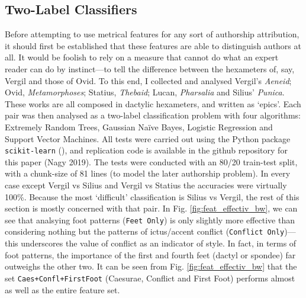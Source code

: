 \documentclass[11pt,a4paper]{scrartcl} %
\begin{document}
{\subsection{Two-Label Classifiers}

Before attempting to use metrical features for any sort of authorship attribution, it should first be established that these features are able to distinguish authors at all. It would be foolish to rely on a measure that cannot do what an expert reader can do by instinct---to tell the difference between the hexameters of, say, Vergil and those of Ovid. To this end, I collected and analysed Vergil's \textit{Aeneid}; Ovid, \textit{Metamorphoses}; Statius, \textit{Thebaid}; Lucan, \textit{Pharsalia} and Silius' \textit{Punica}. These works are all composed in dactylic hexameters, and written as `epics'. Each pair was then analysed as a two-label classification problem with four algorithms: Extremely Random Trees, Gaussian Naïve Bayes, Logistic Regression and Support Vector Machines. All tests were carried out using the Python package \texttt{scikit-learn} (\cite{scikit-learn}), and replication code is available in the github repository for this paper (Nagy 2019). The tests were conducted with an 80/20 train-test split, with a chunk-size of 81 lines (to model the later authorship problem). In every case except Vergil vs Silius and Vergil vs Statius the accuracies were virtually 100\%. Because the most `difficult' classification is Silius vs Vergil, the rest of this section is mostly concerned with that pair. In Fig. \ref{fig:feat_effectiv_bw}, we can see that analsying foot patterns (\texttt{Feet Only}) is only slightly more effective than considering nothing but the patterns of ictus/accent conflict (\texttt{Conflict Only})---this underscores the value of conflict as an indicator of style. In fact, in terms of foot patterns, the importance of the first and fourth feet (dactyl or spondee) far outweighs the other two. It can be seen from Fig. \ref{fig:feat_effectiv_bw} that the set \texttt{Caes+Confl+FirstFoot} (Caesurae, Conflict and First Foot) performs almost as well as the entire feature set.

}
\end{document}
